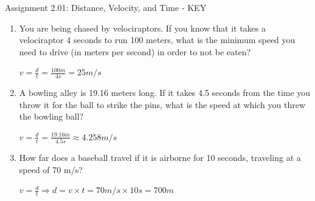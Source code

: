 \documentclass[letterpaper, 12pt]{article}
\begin{document}


\begin{center} Assignment 2.01: Distance, Velocity, and Time - KEY
\end{center}





\begin{enumerate}

\item You are being chased by velociraptors.  If you know that it takes a velociraptor 4 seconds to run 100 meters, what is the minimum speed you need to drive (in meters per second) in order to not be eaten?
\color{red}
\begin{center} $ v = \frac{d}{t} = \frac{100m}{4s} = 25 m/s $
	


\end{center}

\vspace{0.15in}
\color{black}
\item A bowling alley is 19.16 meters long.  If it takes 4.5 seconds from the time you throw it for the ball to strike the pins, what is the speed at which you threw the bowling ball?
\color{red}
\begin{center} $ v = \frac{d}{t} = \frac{19.16m}{4.5s} \approx 4.258 m/s $
	
\end{center}


\vspace{0.15in}
\color{black}
\item How far does a baseball travel if it is airborne for 10 seconds, traveling at a speed of 70 m/s?
\color{red}

\begin{center} $ v = \frac{d}{t} \Longrightarrow d = v \times t = 70 m/s \times 10 s = 700 m $
	
\end{center}


\vspace{0.15in}
\color{black}


\end{enumerate}
\end{document}

